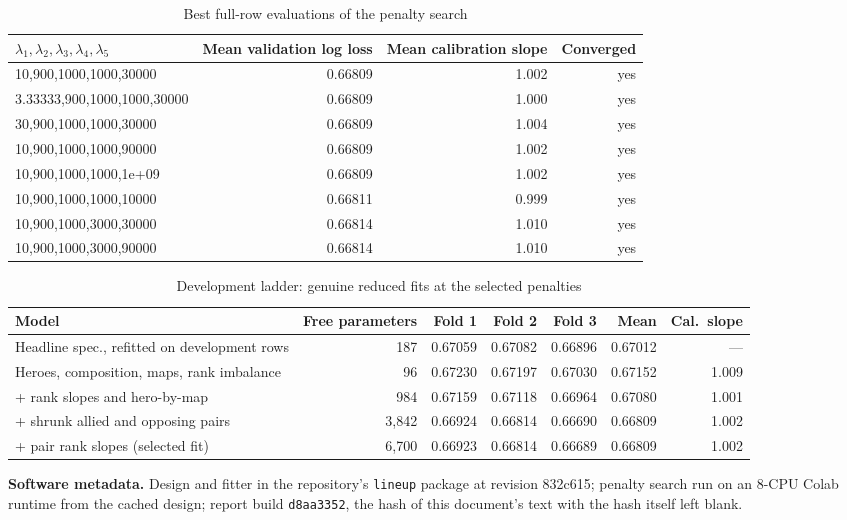 \documentclass[11pt]{article}
\begin{document}
\begin{table}[H]\centering\footnotesize
\caption{Best full-row evaluations of the penalty search}\label{tab:tune}
\begin{tabular}{l r r r}
\toprule
$\lambda_1,\lambda_2,\lambda_3,\lambda_4,\lambda_5$ & Mean validation log loss & Mean calibration slope & Converged \\
\midrule
10,900,1000,1000,30000 & 0.66809 & 1.002 & yes \\
3.33333,900,1000,1000,30000 & 0.66809 & 1.000 & yes \\
30,900,1000,1000,30000 & 0.66809 & 1.004 & yes \\
10,900,1000,1000,90000 & 0.66809 & 1.002 & yes \\
10,900,1000,1000,1e+09 & 0.66809 & 1.002 & yes \\
10,900,1000,1000,10000 & 0.66811 & 0.999 & yes \\
10,900,1000,3000,30000 & 0.66814 & 1.010 & yes \\
10,900,1000,3000,90000 & 0.66814 & 1.010 & yes \\
\bottomrule
\end{tabular}
\end{table}

\begin{table}[H]\centering\footnotesize
\caption{Development ladder: genuine reduced fits at the selected penalties}\label{tab:ladder}
\begin{tabular}{l r r r r r r}
\toprule
Model & Free parameters & Fold 1 & Fold 2 & Fold 3 & Mean & Cal.\ slope \\
\midrule
Headline spec., refitted on development rows & 187 & 0.67059 & 0.67082 & 0.66896 & 0.67012 & --- \\
Heroes, composition, maps, rank imbalance & 96 & 0.67230 & 0.67197 & 0.67030 & 0.67152 & 1.009 \\
+ rank slopes and hero-by-map & 984 & 0.67159 & 0.67118 & 0.66964 & 0.67080 & 1.001 \\
+ shrunk allied and opposing pairs & 3,842 & 0.66924 & 0.66814 & 0.66690 & 0.66809 & 1.002 \\
+ pair rank slopes (selected fit) & 6,700 & 0.66923 & 0.66814 & 0.66689 & 0.66809 & 1.002 \\
\bottomrule
\end{tabular}
\end{table}

\textbf{Software metadata.} Design and fitter in the repository's \texttt{lineup} package at revision
832c615; penalty search run on an 8-CPU Colab runtime from the cached design; report build
\texttt{d8aa3352}, the hash of this document's text with the hash itself left blank.
\end{document}
